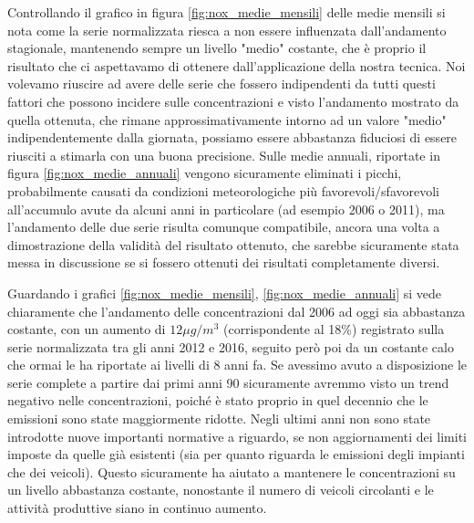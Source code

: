 
Controllando il grafico in figura \ref{fig:nox_medie_mensili} delle medie mensili si nota come la serie normalizzata riesca a non essere influenzata dall'andamento stagionale, mantenendo sempre un livello "medio" costante, che è proprio il risultato che ci aspettavamo di ottenere dall'applicazione della nostra tecnica. Noi volevamo riuscire ad avere delle serie che fossero indipendenti da tutti questi fattori che possono incidere sulle concentrazioni e visto l'andamento mostrato da quella ottenuta, che rimane approssimativamente intorno ad un valore "medio" indipendentemente dalla giornata, possiamo essere abbastanza fiduciosi di essere riusciti a stimarla con una buona precisione.
Sulle medie annuali, riportate in figura \ref{fig:nox_medie_annuali} vengono sicuramente eliminati i picchi, probabilmente causati da condizioni meteorologiche più favorevoli/sfavorevoli all'accumulo avute da alcuni anni in particolare (ad esempio 2006 o 2011), ma l'andamento delle due serie risulta comunque compatibile, ancora una volta a dimostrazione della validità del risultato ottenuto, che sarebbe sicuramente stata messa in discussione se si fossero ottenuti dei risultati completamente diversi.

Guardando
i grafici \ref{fig:nox_medie_mensili}, \ref{fig:nox_medie_annuali} si vede chiaramente che l'andamento delle concentrazioni dal 2006 ad oggi sia abbastanza costante, con un aumento di $12\mu g/m^3$ (corrispondente al 18\%) registrato sulla serie normalizzata tra gli anni 2012 e 2016, seguito però poi da un costante calo che ormai le ha riportate ai livelli di 8 anni fa. Se avessimo avuto a disposizione le serie complete a partire dai primi anni 90 sicuramente avremmo visto un trend negativo nelle concentrazioni, poiché è stato proprio in quel decennio che le emissioni sono state maggiormente ridotte. Negli ultimi anni non sono state introdotte nuove importanti normative a riguardo, se non aggiornamenti dei limiti imposte da quelle già esistenti (sia per quanto riguarda le emissioni degli impianti che dei veicoli). Questo sicuramente ha aiutato a mantenere le concentrazioni su un livello abbastanza costante, nonostante il numero di veicoli circolanti e le attività produttive siano in continuo aumento.

